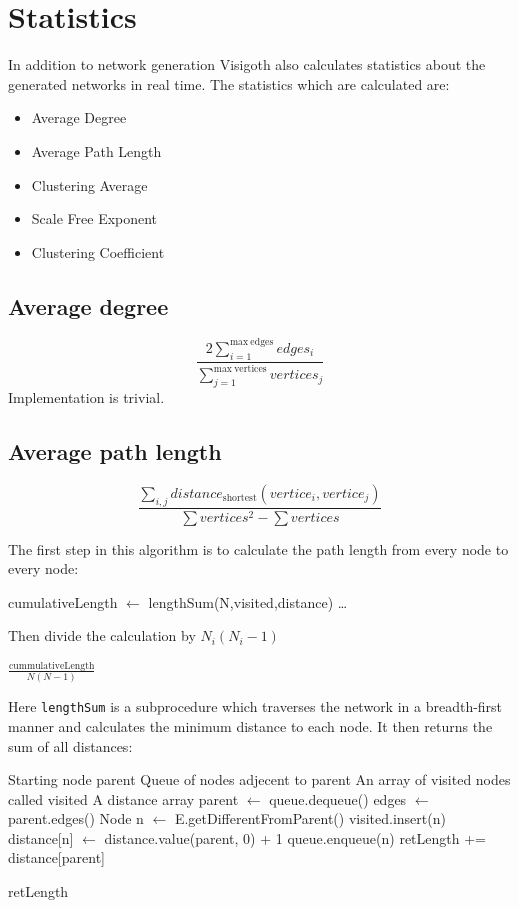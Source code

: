 \documentclass[a4paper,11pt,titlepage]{article}
\let\stdsection\section         %
\renewcommand{\section}{\newpage\stdsection}
\newcommand{\code}[1]{\texttt{#1}}
\begin{document}
\section{Statistics}
In addition to network generation Visigoth also calculates statistics about the
generated networks in real time. The statistics which are calculated are:

\begin{itemize}
  \item Average Degree
  \item Average Path Length
  \item Clustering Average
  \item Scale Free Exponent
  \item Clustering Coefficient
\end{itemize}

\subsection{Average degree}
\[
  \frac{2\sum_{i=1}^{\mathrm{max\ edges}} edges_i}
       {\sum_{j=1}^{\mathrm{max\ vertices}} vertices_j}
\]
Implementation is trivial.

\subsection{Average path length}
\[
\frac{\sum_{i,j}distance_\mathrm{shortest}(vertice_i,vertice_j)}{\sum
vertices^2 - \sum vertices}
\]

The first step in this algorithm is to calculate the path
length from every node to every node:

\begin{algorithmic}
    \STATE cumulativeLength $\gets$ lengthSum(N,visited,distance)
    \STATE \dots
  \ENDFOR
\end{algorithmic}

Then divide the calculation by $N_i(N_i-1)$

\begin{algorithmic}
  \RETURN $\frac{\mathrm{cummulativeLength}}{N(N-1)}$
\end{algorithmic}

Here \code{lengthSum} is a subprocedure which traverses the network in a
breadth-first manner and calculates the minimum distance to each node.
It then returns the sum of all distances:

\begin{algorithmic}
  \REQUIRE Starting node parent
  \REQUIRE Queue of nodes adjecent to parent
  \REQUIRE An array of visited nodes called visited
  \REQUIRE A distance array
    \STATE parent $\gets$ queue.dequeue()
    \STATE edges $\gets$ parent.edges()
    \STATE Node n $\gets$ E.getDifferentFromParent()
        \STATE visited.insert(n)
        \STATE distance[n] $\gets$ distance.value(parent, 0) + 1
        \STATE queue.enqueue(n)
      \ENDIF
    \ENDFOR
    \STATE retLength += distance[parent]
  \ENDWHILE

  \RETURN retLength
\end{algorithmic}
\end{document}
